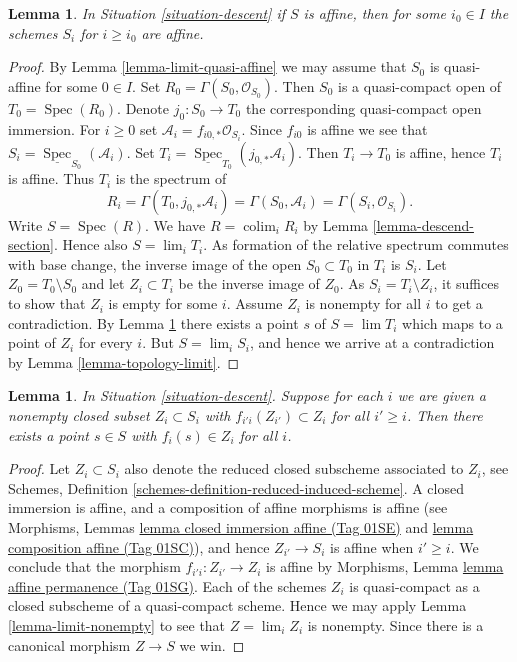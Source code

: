 \documentclass{amsart}
\theoremstyle{plain}
\newtheorem{lemma}[subsection]{Lemma}
\theoremstyle{definition}
\theoremstyle{remark}
\numberwithin{equation}{subsection}
\def\lim{\mathop{\mathrm{lim}}\nolimits}
\def\colim{\mathop{\mathrm{colim}}\nolimits}
\def\Spec{\mathop{\mathrm{Spec}}}
\begin{document}
\begin{lemma}
\label{lemma-limit-affine}
In Situation \ref{situation-descent} if $S$ is affine,
then for some $i_0 \in I$ the schemes $S_i$ for $i \geq i_0$
are affine.
\end{lemma}

\begin{proof}
By Lemma \ref{lemma-limit-quasi-affine} we may assume that $S_0$ is
quasi-affine for some $0 \in I$. Set $R_0 = \Gamma(S_0, \mathcal{O}_{S_0})$.
Then $S_0$ is a quasi-compact open of $T_0 = \Spec(R_0)$. Denote
$j_0 : S_0 \to T_0$ the corresponding quasi-compact open immersion.
For $i \geq 0$ set $\mathcal{A}_i = f_{i0, *}\mathcal{O}_{S_i}$.
Since $f_{i0}$ is affine we see that
$S_i = \underline{\Spec}_{S_0}(\mathcal{A}_i)$.
Set $T_i = \underline{\Spec}_{T_0}(j_{0, *}\mathcal{A}_i)$.
Then $T_i \to T_0$ is affine, hence $T_i$ is affine. Thus
$T_i$ is the spectrum of
$$
R_i = \Gamma(T_0, j_{0, *}\mathcal{A}_i) = \Gamma(S_0, \mathcal{A}_i) =
\Gamma(S_i, \mathcal{O}_{S_i}).
$$
Write $S = \Spec(R)$. We have $R = \colim_i R_i$
by Lemma \ref{lemma-descend-section}.
Hence also $S = \lim_i T_i$. As formation of the relative spectrum commutes
with base change, the inverse image
of the open $S_0 \subset T_0$ in $T_i$ is $S_i$.
Let $Z_0 = T_0 \setminus S_0$ and let $Z_i \subset T_i$
be the inverse image of $Z_0$. As $S_i = T_i \setminus Z_i$, it suffices
to show that $Z_i$ is empty for some $i$. Assume $Z_i$ is nonempty for all
$i$ to get a contradiction. By Lemma \ref{lemma-limit-closed-nonempty}
there exists a point $s$ of $S = \lim T_i$ which maps to a point of $Z_i$
for every $i$. But $S = \lim_i S_i$, and hence we arrive at a contradiction
by Lemma \ref{lemma-topology-limit}.
\end{proof}


\begin{lemma}
\label{lemma-limit-closed-nonempty}
In Situation \ref{situation-descent}.
Suppose for each $i$ we are given a nonempty closed subset
$Z_i \subset S_i$ with $f_{i'i}(Z_{i'}) \subset Z_i$ for all
$i' \geq i$.
Then there exists a point $s \in S$ with $f_i(s) \in Z_i$ for
all $i$.
\end{lemma}

\begin{proof}
Let $Z_i \subset S_i$ also denote the reduced closed subscheme
associated to $Z_i$, see Schemes,
Definition \ref{schemes-definition-reduced-induced-scheme}.
A closed immersion is affine, and a composition of affine
morphisms is affine (see
Morphisms, Lemmas \href{https://stacks.math.columbia.edu/tag/01SE}{lemma closed immersion affine (Tag 01SE)}
and \href{https://stacks.math.columbia.edu/tag/01SC}{lemma composition affine (Tag 01SC)}), and hence $Z_{i'} \to S_i$ is
affine when $i' \geq i$. We conclude that the morphism
$f_{i'i} : Z_{i'} \to Z_i$ is affine by
Morphisms, Lemma \href{https://stacks.math.columbia.edu/tag/01SG}{lemma affine permanence (Tag 01SG)}.
Each of the schemes $Z_i$ is quasi-compact as a closed
subscheme of a quasi-compact scheme. Hence we may apply
Lemma \ref{lemma-limit-nonempty} to see that
$Z = \lim_i Z_i$ is nonempty. Since there is a
canonical morphism $Z \to S$ we win.
\end{proof}
\end{document}
